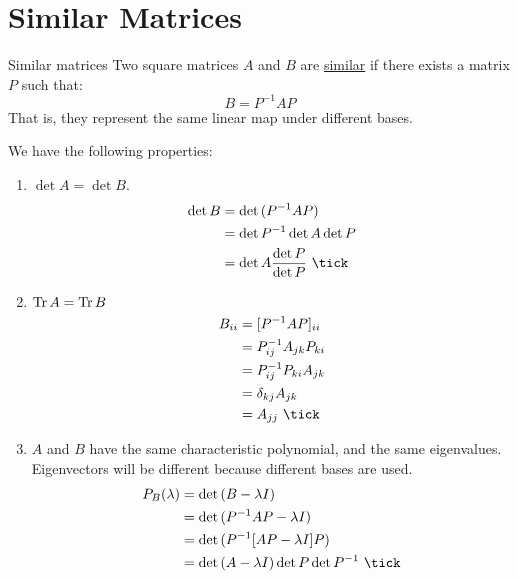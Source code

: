 \documentclass[../Main.tex]{subfiles}
\begin{document}
\section{Similar Matrices}
\begin{definition}{Similar matrices}
    Two square matrices $A$ and $B$ are \underline{similar} if there exists a matrix $P$ such that:
    \begin{equation*}
        B = P^{-1} A P
    \end{equation*}
    That is, they represent the same linear map under different bases.
\end{definition}
We have the following properties:
\begin{enumerate}
    \item $\det{A} = \det{B}$.
        \begin{align*}
            \det{B} &= \det{(P^{-1} A P)} \\
            &= \det{P^{-1}} \det{A} \det{P} \\
            &= \det{A} \frac{\det{P}}{\det{P}}~\tick
        \end{align*}
    \item $\operatorname{Tr}{A} = \operatorname{Tr}{B}$
        \begin{align*}
            B_{ii} &= [P^{-1}AP]_{ii} \\
            &= P_{ij}^{-1} A_{jk} P_{ki} \\
            &= P_{ij}^{-1} P_{ki} A_{jk} \\
            &= \delta_{kj} A_{jk} \\
            &= A_{jj}~\tick
        \end{align*}
    \item $A$ and $B$ have the same characteristic polynomial, and the same eigenvalues. Eigenvectors will be different because different bases are used.
        \begin{align*}
            P_B(\lambda) &= \det{(B - \lambda I)} \\
            &= \det{(P^{-1} A P - \lambda I)} \\
            &= \det{(P^{-1}[AP - \lambda I]P)} \\
            &= \det{(A - \lambda I)} \det{P} \det{P^{-1}}~\tick
        \end{align*}
\end{enumerate}
\end{document}
